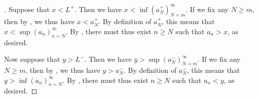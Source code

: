 \begin{proof}[]
  Suppose that \(x < L^+\).
  Then we have \(x < \inf(a_N^+)_{N = m}^\infty\).
  If we fix any \(N \geq m\), then by , we thus have \(x < a_N^+\).
  By definition of \(a_N^+\), this means that \(x < \sup(a_n)_{n = N}^\infty\).
  By , there must thus exist \(n \geq N\) such that \(a_n > x\), as desired.

  Now suppose that \(y > L^-\).
  Then we have \(y > \sup(a_N^-)_{N = m}^\infty\).
  If we fix any \(N \geq m\), then by , we thus have \(y > a_N^-\).
  By definition of \(a_N^-\), this means that \(y > \inf(a_n)_{n = N}^\infty\).
  By , there must thus exist \(n \geq N\) such that \(a_n < y\), as desired.
\end{proof}

